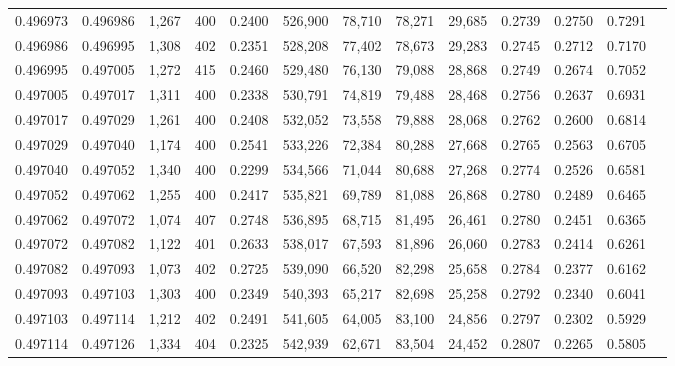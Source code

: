 \begin{tabular}{rrrrrrrrrrrrr}
0.496973 & 0.496986 & 1,267 & 400 &                                     0.2400 & 526,900 &  78,710 &  78,271 &  29,685 & 0.2739 & 0.2750 & 0.7291 \\
0.496986 & 0.496995 & 1,308 & 402 &                                     0.2351 & 528,208 &  77,402 &  78,673 &  29,283 & 0.2745 & 0.2712 & 0.7170 \\
0.496995 & 0.497005 & 1,272 & 415 &                                     0.2460 & 529,480 &  76,130 &  79,088 &  28,868 & 0.2749 & 0.2674 & 0.7052 \\
0.497005 & 0.497017 & 1,311 & 400 &                                     0.2338 & 530,791 &  74,819 &  79,488 &  28,468 & 0.2756 & 0.2637 & 0.6931 \\
0.497017 & 0.497029 & 1,261 & 400 &                                     0.2408 & 532,052 &  73,558 &  79,888 &  28,068 & 0.2762 & 0.2600 & 0.6814 \\
0.497029 & 0.497040 & 1,174 & 400 &                                     0.2541 & 533,226 &  72,384 &  80,288 &  27,668 & 0.2765 & 0.2563 & 0.6705 \\
0.497040 & 0.497052 & 1,340 & 400 &                                     0.2299 & 534,566 &  71,044 &  80,688 &  27,268 & 0.2774 & 0.2526 & 0.6581 \\
0.497052 & 0.497062 & 1,255 & 400 &                                     0.2417 & 535,821 &  69,789 &  81,088 &  26,868 & 0.2780 & 0.2489 & 0.6465 \\
0.497062 & 0.497072 & 1,074 & 407 &                                     0.2748 & 536,895 &  68,715 &  81,495 &  26,461 & 0.2780 & 0.2451 & 0.6365 \\
0.497072 & 0.497082 & 1,122 & 401 &                                     0.2633 & 538,017 &  67,593 &  81,896 &  26,060 & 0.2783 & 0.2414 & 0.6261 \\
0.497082 & 0.497093 & 1,073 & 402 &                                     0.2725 & 539,090 &  66,520 &  82,298 &  25,658 & 0.2784 & 0.2377 & 0.6162 \\
0.497093 & 0.497103 & 1,303 & 400 &                                     0.2349 & 540,393 &  65,217 &  82,698 &  25,258 & 0.2792 & 0.2340 & 0.6041 \\
0.497103 & 0.497114 & 1,212 & 402 &                                     0.2491 & 541,605 &  64,005 &  83,100 &  24,856 & 0.2797 & 0.2302 & 0.5929 \\
0.497114 & 0.497126 & 1,334 & 404 &                                     0.2325 & 542,939 &  62,671 &  83,504 &  24,452 & 0.2807 & 0.2265 & 0.5805 \\

\end{tabular}
